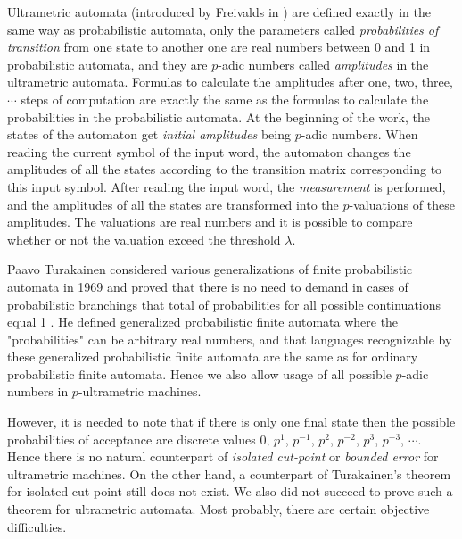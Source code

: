 \documentclass{llncs}
\begin{document}
Ultrametric automata (introduced by Freivalds in \cite{F12}) are defined exactly in the same way as probabilistic automata, only the parameters called {\em probabilities of transition}  from one state to another one are real numbers between 0 and 1 in probabilistic automata, and they are $p$-adic numbers called {\em amplitudes} in the ultrametric automata. Formulas to calculate the amplitudes after one, two, three, $\cdots $ steps of computation are exactly the same as the formulas to calculate the probabilities in the probabilistic automata. At the beginning of the work, the states of the automaton get {\em initial amplitudes} being $p$-adic numbers. When reading the current symbol of the input word, the automaton changes the amplitudes of all the states according to the transition matrix corresponding to this input symbol. 
After reading the input word, the {\em measurement} is performed, and the  amplitudes of all the states are transformed into the $p$-valuations of these amplitudes. The valuations are real numbers and it is possible to compare whether or not the valuation exceed the threshold $\lambda $.

Paavo Turakainen considered various generalizations of finite probabilistic automata in 1969 and proved that there is no need to demand in cases of probabilistic branchings that total of probabilities for all possible continuations equal 1 \cite{T69}. He defined generalized probabilistic finite automata where the "probabilities" can be arbitrary real numbers, and that languages recognizable by these generalized probabilistic finite automata are the same as for ordinary probabilistic finite automata. Hence we also allow usage of all possible $p$-adic numbers in $p$-ultrametric machines.

However, it is needed to note that if there is only one final state then the possible probabilities of acceptance are discrete values $0$, $p^1$, $p^{-1}$, $p^2$, $p^{-2}$, $p^3$, $p^{-3}$, $\cdots $. Hence there is no natural counterpart of {\em isolated cut-point} or {\em bounded error} for ultrametric machines. On the other hand, a counterpart of Turakainen's theorem for isolated cut-point still does not exist. We also did not succeed to prove such a theorem for ultrametric automata. Most probably, there are certain objective difficulties.
\end{document}
